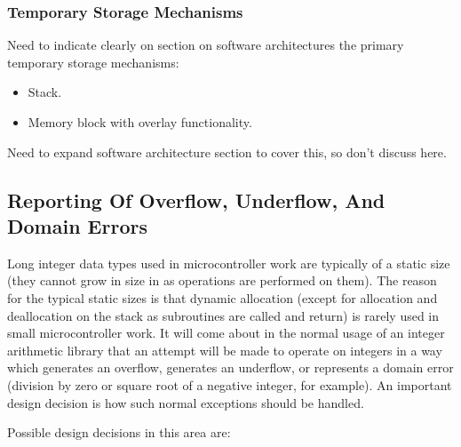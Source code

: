 \subsubsection{Temporary Storage Mechanisms}
\label{ccil0:spdi0:sppm0:stsm0}

Need to indicate clearly on section on software architectures the
primary temporary storage mechanisms:

\begin{itemize}
\item Stack.
\item Memory block with overlay functionality.
\end{itemize}

Need to expand software architecture section to cover this, so don't
discuss here.


\subsection{Reporting Of Overflow, Underflow, And Domain Errors}
\label{ccil0:spdi0:soud0}

Long integer data types used in microcontroller work are typically
of a static size (they cannot grow in size in as operations are 
performed on them).  The reason for the typical static sizes is that
dynamic allocation (except for allocation and
deallocation on the stack as subroutines
are called and return) is rarely used in small microcontroller work.
It will come about in the normal usage of an integer arithmetic 
library that an attempt will be made to operate on integers in
a way which generates an overflow, generates an
underflow, or
represents a domain error (division by zero or
square root of a negative integer, for example).
An important design decision is how such normal exceptions should be
handled.

Possible design decisions in this area are:

